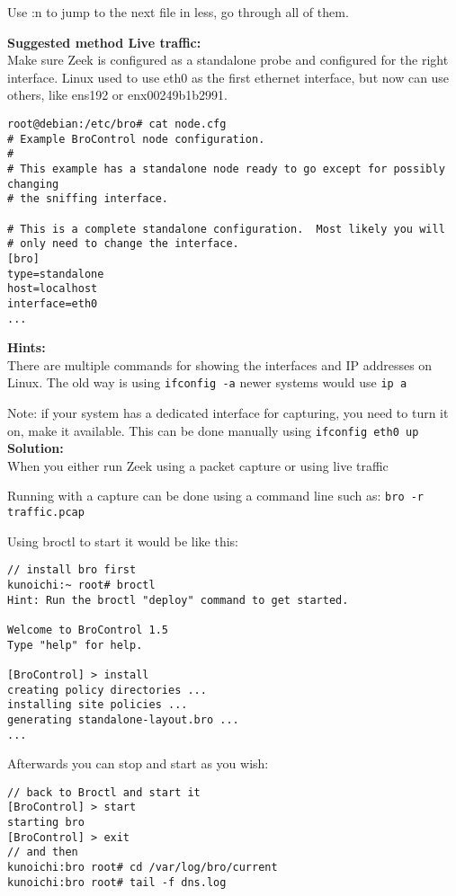 \documentclass[a4paper,11pt,notitlepage]{report}
\begin{document}
Use :n to jump to the next file in less, go through all of them.

{\bf Suggested method Live traffic:}\\
Make sure Zeek is configured as a standalone probe and configured for the right interface. Linux used to use eth0 as the first ethernet interface, but now can use others, like ens192 or enx00249b1b2991.

\begin{verbatim}
root@debian:/etc/bro# cat node.cfg
# Example BroControl node configuration.
#
# This example has a standalone node ready to go except for possibly changing
# the sniffing interface.

# This is a complete standalone configuration.  Most likely you will
# only need to change the interface.
[bro]
type=standalone
host=localhost
interface=eth0
...
\end{verbatim}


{\bf Hints:}\\
There are multiple commands for showing the interfaces and IP addresses on Linux. The old way is using \verb+ifconfig -a+ newer systems would use \verb+ip a+

Note: if your system has a dedicated interface for capturing, you need to turn it on, make it available. This can be done manually using \verb+ifconfig eth0 up+
{\bf Solution:}\\
When you either run Zeek using a packet capture or using live traffic

Running with a capture can be done using a command line such as:
\verb+bro -r traffic.pcap+

Using broctl to start it would be like this:
\begin{verbatim}
// install bro first
kunoichi:~ root# broctl
Hint: Run the broctl "deploy" command to get started.

Welcome to BroControl 1.5
Type "help" for help.

[BroControl] > install
creating policy directories ...
installing site policies ...
generating standalone-layout.bro ...
...
\end{verbatim}

Afterwards you can stop and start as you wish:
\begin{verbatim}
// back to Broctl and start it
[BroControl] > start
starting bro
[BroControl] > exit
// and then
kunoichi:bro root# cd /var/log/bro/current
kunoichi:bro root# tail -f dns.log
\end{verbatim}
\end{document}
